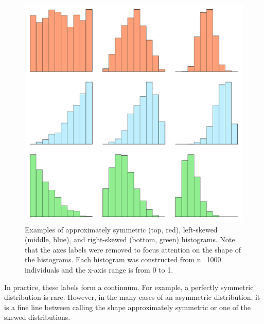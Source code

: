 \begin{knitrout}
\color{fgcolor}\begin{figure}
\includegraphics[width=.7\linewidth]{figure/ShapeExamples-1} \caption[Examples of approximately symmetric (top, red), left-skewed (middle, blue), and right-skewed (bottom, green) histograms]{Examples of approximately symmetric (top, red), left-skewed (middle, blue), and right-skewed (bottom, green) histograms. Note that the axes labels were removed to focus attention on the shape of the histograms. Each histogram was constructed from n=1000 individuals and the x-axis range is from 0 to 1.}\label{fig:ShapeExamples}
\end{figure}


\end{knitrout}


\vspace{-12pt}

\vspace{-12pt}

\vspace{-12pt}

In practice, these labels form a continuum. For example, a perfectly symmetric distribution is rare. However, in the many cases of an asymmetric distribution, it is a fine line between calling the shape approximately symmetric or one of the skewed distributions.

